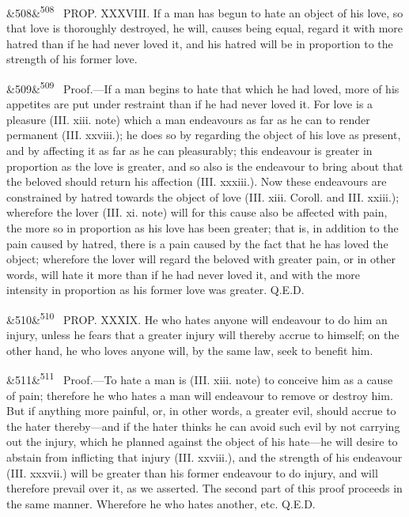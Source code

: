 \documentclass[12pt]{article}
\newcommand{\para}[1][]{\par\noindent\ifx&#1&\else\textsuperscript{\footnotesize #1}~\fi}
\begin{document}
\para[508] PROP. XXXVIII. If a man has begun to hate an object of his love, so that love is thoroughly destroyed, he will, causes being equal, regard it with more hatred than if he had never loved it, and his hatred will be in proportion to the strength of his former love.

\para[509] Proof.---If a man begins to hate that which he had loved, more of his appetites are put under restraint than if he had never loved it. For love is a pleasure (III. xiii. note) which a man endeavours as far as he can to render permanent (III. xxviii.); he does so by regarding the object of his love as present, and by affecting it as far as he can pleasurably; this endeavour is greater in proportion as the love is greater, and so also is the endeavour to bring about that the beloved should return his affection (III. xxxiii.). Now these endeavours are constrained by hatred towards the object of love (III. xiii. Coroll. and III. xxiii.); wherefore the lover (III. xi. note) will for this cause also be affected with pain, the more so in proportion as his love has been greater; that is, in addition to the pain caused by hatred, there is a pain caused by the fact that he has loved the object; wherefore the lover will regard the beloved with greater pain, or in other words, will hate it more than if he had never loved it, and with the more intensity in proportion as his former love was greater. Q.E.D.

\para[510] PROP. XXXIX. He who hates anyone will endeavour to do him an injury, unless he fears that a greater injury will thereby accrue to himself; on the other hand, he who loves anyone will, by the same law, seek to benefit him.

\para[511] Proof.---To hate a man is (III. xiii. note) to conceive him as a cause of pain; therefore he who hates a man will endeavour to remove or destroy him. But if anything more painful, or, in other words, a greater evil, should accrue to the hater thereby---and if the hater thinks he can avoid such evil by not carrying out the injury, which he planned against the object of his hate---he will desire to abstain from inflicting that injury (III. xxviii.), and the strength of his endeavour (III. xxxvii.) will be greater than his former endeavour to do injury, and will therefore prevail over it, as we asserted. The second part of this proof proceeds in the same manner. Wherefore he who hates another, etc. Q.E.D.
\end{document}
